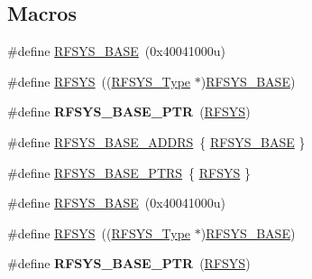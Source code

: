 \subsection*{Macros}
\begin{DoxyCompactItemize}
\item 
\#define \hyperlink{group__RFSYS__Peripheral__Access__Layer_ga742dcff49e1d900ccc5fb6d716dac969}{R\+F\+S\+Y\+S\+\_\+\+B\+A\+SE}~(0x40041000u)
\item 
\#define \hyperlink{group__RFSYS__Peripheral__Access__Layer_ga83a5a75f5421c69ce93437b8be3c1144}{R\+F\+S\+YS}~((\hyperlink{structRFSYS__Type}{R\+F\+S\+Y\+S\+\_\+\+Type} $\ast$)\hyperlink{group__RFSYS__Peripheral__Access__Layer_ga742dcff49e1d900ccc5fb6d716dac969}{R\+F\+S\+Y\+S\+\_\+\+B\+A\+SE})
\item 
\#define {\bfseries R\+F\+S\+Y\+S\+\_\+\+B\+A\+S\+E\+\_\+\+P\+TR}~(\hyperlink{group__RFSYS__Peripheral__Access__Layer_ga83a5a75f5421c69ce93437b8be3c1144}{R\+F\+S\+YS})\hypertarget{group__RFSYS__Peripheral__Access__Layer_ga2dab66eae1abcaf22879dbce661ea2fa}{}\label{group__RFSYS__Peripheral__Access__Layer_ga2dab66eae1abcaf22879dbce661ea2fa}

\item 
\#define \hyperlink{group__RFSYS__Peripheral__Access__Layer_ga65742e072e59ddefb5bc976bbd6f517b}{R\+F\+S\+Y\+S\+\_\+\+B\+A\+S\+E\+\_\+\+A\+D\+D\+RS}~\{ \hyperlink{group__RFSYS__Peripheral__Access__Layer_ga742dcff49e1d900ccc5fb6d716dac969}{R\+F\+S\+Y\+S\+\_\+\+B\+A\+SE} \}
\item 
\#define \hyperlink{group__RFSYS__Peripheral__Access__Layer_ga59f6caa8732744ac3a9f91828ec2daa1}{R\+F\+S\+Y\+S\+\_\+\+B\+A\+S\+E\+\_\+\+P\+T\+RS}~\{ \hyperlink{group__RFSYS__Peripheral__Access__Layer_ga83a5a75f5421c69ce93437b8be3c1144}{R\+F\+S\+YS} \}
\item 
\#define \hyperlink{group__RFSYS__Peripheral__Access__Layer_ga742dcff49e1d900ccc5fb6d716dac969}{R\+F\+S\+Y\+S\+\_\+\+B\+A\+SE}~(0x40041000u)
\item 
\#define \hyperlink{group__RFSYS__Peripheral__Access__Layer_ga83a5a75f5421c69ce93437b8be3c1144}{R\+F\+S\+YS}~((\hyperlink{structRFSYS__Type}{R\+F\+S\+Y\+S\+\_\+\+Type} $\ast$)\hyperlink{group__RFSYS__Peripheral__Access__Layer_ga742dcff49e1d900ccc5fb6d716dac969}{R\+F\+S\+Y\+S\+\_\+\+B\+A\+SE})
\item 
\#define {\bfseries R\+F\+S\+Y\+S\+\_\+\+B\+A\+S\+E\+\_\+\+P\+TR}~(\hyperlink{group__RFSYS__Peripheral__Access__Layer_ga83a5a75f5421c69ce93437b8be3c1144}{R\+F\+S\+YS})\hypertarget{group__RFSYS__Peripheral__Access__Layer_ga2dab66eae1abcaf22879dbce661ea2fa}{}\label{group__RFSYS__Peripheral__Access__Layer_ga2dab66eae1abcaf22879dbce661ea2fa}


\end{DoxyCompactItemize}

